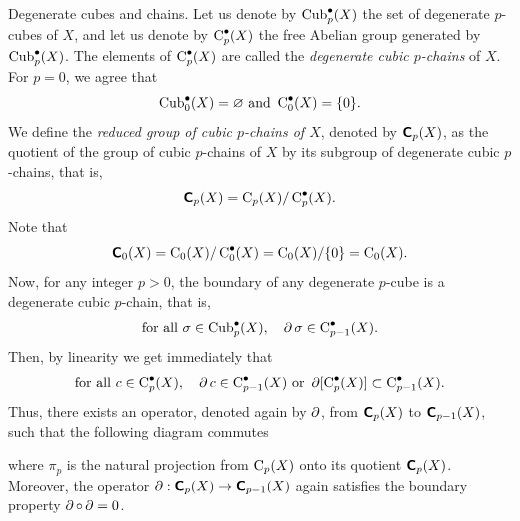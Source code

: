 \begin{Article}{Degenerate cubes and chains.}{}
  Let us denote by $\operatorname{Cub}_{p}^\bullet(X)$ the set of degenerate $p$-cubes of $X$,
  and let us denote by $\operatorname{C}_{p}^\bullet(X)$ the free Abelian group generated by $\operatorname{Cub}_{p}^\bullet(X)$.
  The elements of $\operatorname{C}_{p}^\bullet(X)$ are called the \emph{degenerate cubic $p$-chains} of $X$.
  For $p = 0$,
  we agree that
  $$%
    \DCubes{0}^\bullet(X) = \varnothing \SpacedText{and} \DChains{0}^\bullet(X) = \{0\}.
  $$%
  We define the \emph{reduced group of cubic $p$-chains of $X$},
  denoted by $\operatorname{\textbf{\textsf C}}_{p}(X)$,
  as the quotient of the group of cubic $p$-chains of $X$ by its subgroup of degenerate cubic $p$-chains,
  that is,
  $$%
    \QDChains{p}(X) = \DChains{p}(X)/\DChains{p}^\bullet(X).
  $$%
  Note that
  $$%
    \QDChains{0}(X) = \DChains{0}(X)/ \DChains{0}^\bullet(X) = \DChains{0}(X)/\{0\} =
    \DChains{0}(X).
  $$%
  Now,
  for any integer $p > 0$,
  the boundary of any degenerate $p$-cube is a degenerate cubic $p$-chain,
  that is,
  $$%
    \mbox{for all } \sigma \in \DCubes{p}^\bullet(X),
    \quad
    \Boundary \sigma \in \DChains{p-1}^\bullet(X).
  $$%
  Then,
  by linearity we get immediately that
  $$%
    \mbox{for all } c \in \DChains{p}^\bullet(X),
    \quad \Boundary c \in \DChains{p-1}^\bullet(X)
    \SpacedText{or}
    \Boundary[\DChains{p}^\bullet(X)] \subset \DChains{p-1}^\bullet(X).
  $$%
  Thus,
  there exists an operator,
  denoted again by $\operatorname{\partial}$,
  from $\operatorname{\textbf{\textsf C}}_{p}(X)$ to $\operatorname{\textbf{\textsf C}}_{p-1}(X)$,
  such that the following diagram commutes
  \begin{center}
  \end{center}
  where $\pi_p$ is the natural projection from $\operatorname{C}_{p}(X)$ onto its quotient $\operatorname{\textbf{\textsf C}}_{p}(X)$.
  Moreover,
  the operator $\operatorname{\partial} : \operatorname{\textbf{\textsf C}}_{p}(X) \to \operatorname{\textbf{\textsf C}}_{p-1}(X)$ again satisfies the boundary property $\operatorname{\partial} \circ \operatorname{\partial} = 0$.
\end{Article}


